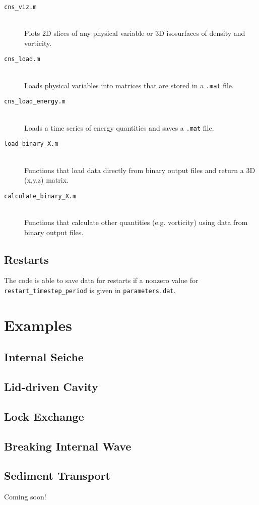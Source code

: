 \documentclass[12pt]{report}
\begin{document}
\begin{description}
\item[\texttt{cns\_viz.m}] \hfill \\Plots 2D slices of any physical variable or 3D isosurfaces of density and vorticity.
\item[\texttt{cns\_load.m}] \hfill \\Loads physical variables into matrices that are stored in a \texttt{.mat} file.
\item[\texttt{cns\_load\_energy.m}] \hfill \\Loads a time series of energy quantities and saves a \texttt{.mat} file.
\item[\texttt{load\_binary\_X.m}] \hfill \\Functions that load data directly from binary output files and return a 3D (x,y,z) matrix.
\item[\texttt{calculate\_binary\_X.m}] \hfill \\Functions that calculate other quantities (e.g. vorticity) using data from binary output files.
\end{description}

\section{Restarts}
The code is able to save data for restarts if a nonzero value for \texttt{restart\_timestep\_period} is given in \texttt{parameters.dat}.

\chapter{Examples}\label{chap:examples}

\section{Internal Seiche}

\section{Lid-driven Cavity}

\section{Lock Exchange}

\section{Breaking Internal Wave}

\section{Sediment Transport}
Coming soon!



\end{document}
